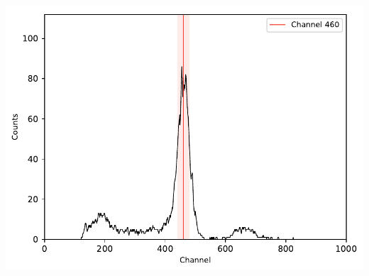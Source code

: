 \begin{multicols}{2}
\begin{center}
\begin{adjustbox}{max width=\linewidth, keepaspectratio}
        \end{adjustbox}
        \label{fig:137Cskoinz1}
    \end{center}
\endminipage
%
\vspace{10mm}
%
\minipage{\linewidth}
    \begin{center}
        \captionsetup{type=figure}
        \begin{adjustbox}{max width=\linewidth, keepaspectratio}
            \includegraphics[]{pdf/comptonpeak}
        \end{adjustbox}
        \label{fig:comptonpeak}
    \end{center}
\endminipage
%
\end{multicols}
%
